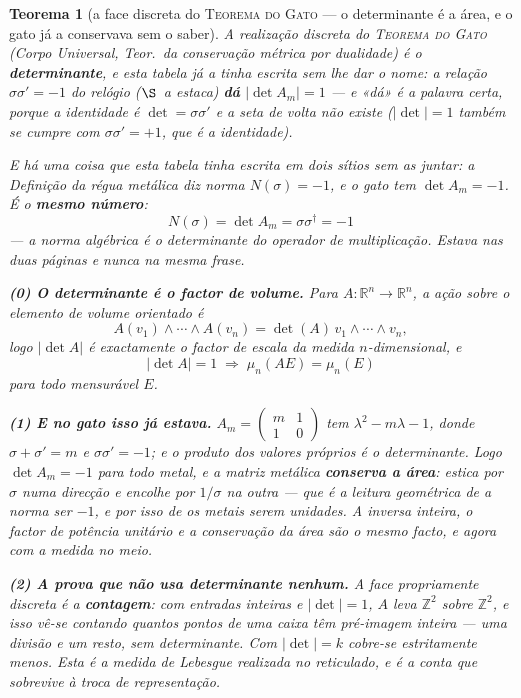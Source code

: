 \documentclass[11pt,a4paper]{article}
\newtheorem{teorema}{Teorema}
\begin{document}
\begin{teorema}[a face discreta do \textsc{Teorema do Gato} --- o
determinante é a área, e o gato já a conservava sem o
saber]\label{thm:det-volume}
A realização discreta do \textsc{Teorema do Gato} (\emph{Corpo
Universal}, Teor.~da conservação métrica por dualidade) é o
\textbf{determinante}, e
esta tabela já a tinha escrita sem lhe dar o nome: a relação
$\sigma\sigma'=-1$ do relógio ($\S$~a estaca) \textbf{dá}
$|\det A_{m}|=1$ --- e «dá» é a palavra certa, porque a identidade é
$\det=\sigma\sigma'$ e a seta de volta não existe ($|\det|=1$ também se
cumpre com $\sigma\sigma'=+1$, que é a identidade).

E há uma coisa que esta tabela tinha escrita em dois sítios sem as
juntar: a Definição da régua metálica diz \emph{norma} $N(\sigma)=-1$, e
o gato tem $\det A_{m}=-1$. É o \textbf{mesmo número}:
\[
\boxed{\;N(\sigma)=\det A_{m}=\sigma\sigma^{\dagger}=-1\;}
\]
--- a norma algébrica \emph{é} o determinante do operador de
multiplicação. Estava nas duas páginas e nunca na mesma frase.

\textbf{(0) O determinante é o factor de volume.} Para
$A:\mathbb{R}^{n}\to\mathbb{R}^{n}$, a ação sobre o elemento de volume
orientado é
\[
A(v_{1})\wedge\cdots\wedge A(v_{n})=\det(A)\,v_{1}\wedge\cdots\wedge
v_{n},
\]
logo $|\det A|$ é exactamente o factor de escala da medida
$n$-dimensional, e
\[
\boxed{\;|\det A|=1\;\Longrightarrow\;\mu_{n}(AE)=\mu_{n}(E)\;}
\]
para todo mensurável $E$.

\textbf{(1) E no gato isso já estava.} $A_{m}=\begin{pmatrix} m & 1\\
1 & 0\end{pmatrix}$ tem $\lambda^{2}-m\lambda-1$, donde
$\sigma+\sigma'=m$ e $\sigma\sigma'=-1$; e o produto dos valores
próprios \emph{é} o determinante. Logo $\det A_{m}=-1$ para todo metal, e
a matriz metálica \textbf{conserva a área}: estica por $\sigma$ numa
direcção e encolhe por $1/\sigma$ na outra --- que é a leitura
geométrica de a norma ser $-1$, e por isso de os metais serem
\emph{unidades}. A inversa inteira, o factor de potência unitário e a
conservação da área são o mesmo facto, e agora com a medida no meio.

\textbf{(2) A prova que não usa determinante nenhum.} A face
propriamente discreta é a \textbf{contagem}: com entradas inteiras e
$|\det|=1$, $A$ leva $\mathbb{Z}^{2}$ \emph{sobre} $\mathbb{Z}^{2}$, e
isso vê-se contando quantos pontos de uma caixa têm pré-imagem inteira
--- uma divisão e um resto, sem determinante. Com $|\det|=k$ cobre-se
estritamente menos. Esta é a medida de Lebesgue realizada no reticulado,
e é a conta que sobrevive à troca de representação.


\end{teorema}
\end{document}
